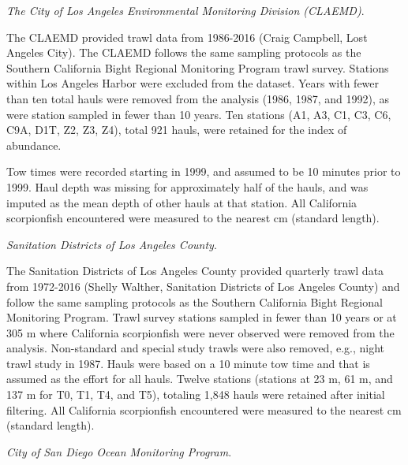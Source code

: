 \documentclass[12pt,]{article}
\begin{document}
\emph{The City of Los Angeles Environmental Monitoring Division
(CLAEMD)}.

The CLAEMD provided trawl data from 1986-2016 (Craig Campbell, Lost
Angeles City). The CLAEMD follows the same sampling protocols as the
Southern California Bight Regional Monitoring Program trawl survey.
Stations within Los Angeles Harbor were excluded from the dataset. Years
with fewer than ten total hauls were removed from the analysis (1986,
1987, and 1992), as were station sampled in fewer than 10 years. Ten
stations (A1, A3, C1, C3, C6, C9A, D1T, Z2, Z3, Z4), total 921 hauls,
were retained for the index of abundance.

Tow times were recorded starting in 1999, and assumed to be 10 minutes
prior to 1999. Haul depth was missing for approximately half of the
hauls, and was imputed as the mean depth of other hauls at that station.
All California scorpionfish encountered were measured to the nearest cm
(standard length).

\emph{Sanitation Districts of Los Angeles County}.

The Sanitation Districts of Los Angeles County provided quarterly trawl
data from 1972-2016 (Shelly Walther, Sanitation Districts of Los Angeles
County) and follow the same sampling protocols as the Southern
California Bight Regional Monitoring Program. Trawl survey stations
sampled in fewer than 10 years or at 305 m where California scorpionfish
were never observed were removed from the analysis. Non-standard and
special study trawls were also removed, e.g., night trawl study in 1987.
Hauls were based on a 10 minute tow time and that is assumed as the
effort for all hauls. Twelve stations (stations at 23 m, 61 m, and 137 m
for T0, T1, T4, and T5), totaling 1,848 hauls were retained after
initial filtering. All California scorpionfish encountered were measured
to the nearest cm (standard length).

\emph{City of San Diego Ocean Monitoring Program}.
\end{document}
